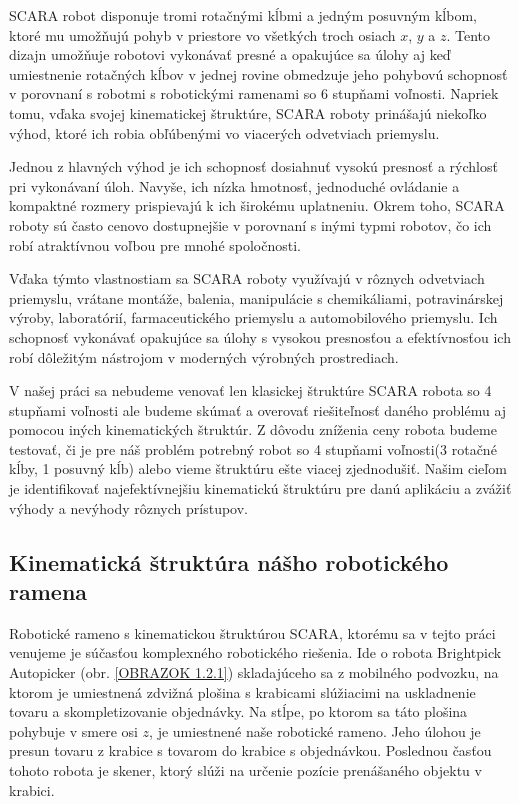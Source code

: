 SCARA robot disponuje tromi rotačnými kĺbmi a jedným posuvným kĺbom, ktoré mu umožňujú pohyb v priestore vo všetkých troch osiach $x$, $y$ a $z$. Tento dizajn umožňuje robotovi vykonávať presné a opakujúce sa úlohy aj keď umiestnenie rotačných kĺbov v jednej rovine obmedzuje jeho pohybovú schopnosť v porovnaní s robotmi  s robotickými ramenami so 6 stupňami voľnosti. Napriek tomu, vďaka svojej kinematickej štruktúre, SCARA roboty prinášajú niekoľko výhod, ktoré ich robia obľúbenými vo viacerých odvetviach priemyslu.

Jednou z hlavných výhod je ich schopnosť dosiahnuť vysokú presnosť a rýchlosť pri vykonávaní úloh. Navyše, ich nízka hmotnosť, jednoduché ovládanie a kompaktné rozmery prispievajú k ich širokému uplatneniu. Okrem toho, SCARA roboty sú často cenovo dostupnejšie v porovnaní s inými typmi robotov, čo ich robí atraktívnou voľbou pre mnohé spoločnosti.

Vďaka týmto vlastnostiam sa SCARA roboty využívajú v rôznych odvetviach priemyslu, vrátane montáže, balenia, manipulácie s chemikáliami, potravinárskej výroby, laboratórií, farmaceutického priemyslu a automobilového priemyslu. Ich schopnosť vykonávať opakujúce sa úlohy s vysokou presnosťou a efektívnosťou ich robí dôležitým nástrojom v moderných výrobných prostrediach.

V našej práci sa nebudeme venovať len klasickej štruktúre SCARA robota so 4 stupňami voľnosti ale budeme skúmať a overovať riešiteľnosť daného problému aj pomocou iných kinematických štruktúr. 
Z dôvodu zníženia ceny robota budeme  testovať, či je pre náš problém potrebný robot so 4 stupňami voľnosti(3 rotačné kĺby, 1 posuvný kĺb) alebo vieme štruktúru ešte viacej zjednodušiť.
Našim cieľom je identifikovať najefektívnejšiu kinematickú štruktúru pre danú aplikáciu a zvážiť výhody a nevýhody rôznych prístupov.  


\subsection{Kinematická štruktúra nášho robotického ramena}
\label{kap:1.2}

Robotické rameno s kinematickou štruktúrou SCARA, ktorému sa v tejto práci venujeme je súčasťou komplexného robotického riešenia. Ide o robota Brightpick Autopicker (obr. \ref{OBRAZOK 1.2.1}) skladajúceho sa z mobilného podvozku, na ktorom je umiestnená zdvižná plošina s krabicami slúžiacimi na uskladnenie tovaru a skompletizovanie objednávky. Na stĺpe, po ktorom sa táto plošina pohybuje v smere osi $z$, je umiestnené naše robotické rameno. Jeho úlohou je presun tovaru z krabice s tovarom do krabice s objednávkou. Poslednou časťou tohoto robota je skener, ktorý slúži na určenie pozície prenášaného objektu v krabici.

